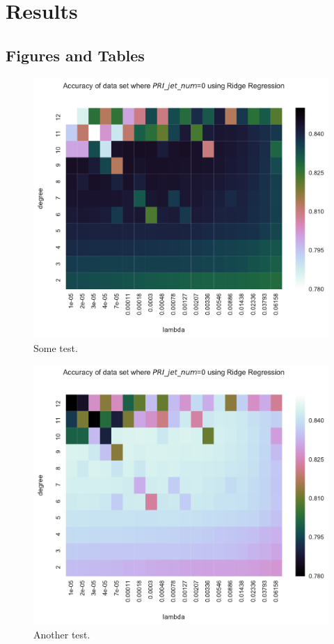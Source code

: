 \documentclass[10pt,conference,compsocconf]{IEEEtran}
\begin{document}
\section{Results}

\subsection{Figures and Tables}


\begin{figure}[tbp]
  \centering
  \includegraphics[width=\columnwidth]{figures/0_ridge_regression_black_version}
  \caption{Some test.}
  \vspace{-3mm}
  \label{fig:denoise-fourier}
\end{figure}
\begin{figure}[htbp]
  \centering
  \includegraphics[width=\columnwidth]{figures/0_ridge_regression_white_version}
  \vspace{-3mm}
  \caption{Another test.}
  \label{fig:denoise-wavelet}
\end{figure}
\end{document}
